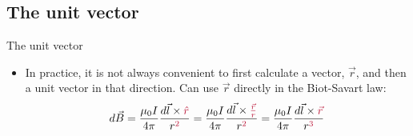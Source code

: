 \documentclass[aspectratio=169,
hyperref={colorlinks,urlcolor=blue}
]{beamer}
\begin{document}
\subsection{The unit vector}
\label{subsec:theunitvector}
\begin{frame}{The unit vector}
\begin{itemize}
\item In practice, it is not always convenient to first calculate a vector, $\vec r$, and then a unit vector in that direction. Can use $\vec r$  directly in the Biot-Savart law:
\begin{align*}
d\vec B = \frac{\mu_0I}{4\pi}\frac{d\vec l\times \textcolor{qred}{\hat r}}{r^{\textcolor{qred}{2}}}
=\frac{\mu_0I}{4\pi}\frac{d\vec l\times \textcolor{qred}{\frac{\vec r}{r}}}{r^{\textcolor{qred}{2}}}
 = \frac{\mu_0I}{4\pi}\frac{d\vec l\times \textcolor{qred}{\vec r}}{r^{\textcolor{qred}{3}}} 
\end{align*}
\end{itemize}
\end{frame}


\end{document}
